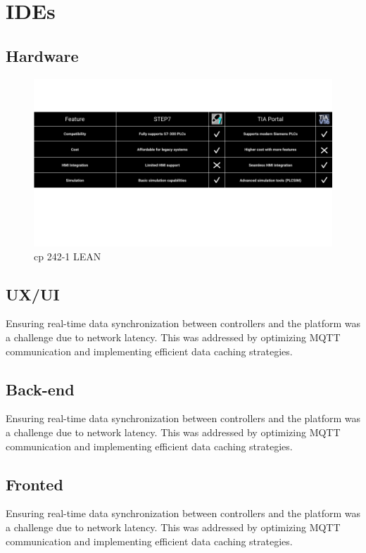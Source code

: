 \section{IDEs}

\subsection{Hardware}
\begin{figure}[H]
    \centering
    \includegraphics[width=1\textwidth]{chapters/3/img/101.png}
    \caption{cp 242-1 LEAN}
    \label{fig:campus}
\end{figure}

\subsection{UX/UI}
Ensuring real-time data synchronization between controllers and the platform was a challenge due to network latency. This was addressed by optimizing MQTT communication and implementing efficient data caching strategies.

\subsection{Back-end}
Ensuring real-time data synchronization between controllers and the platform was a challenge due to network latency. This was addressed by optimizing MQTT communication and implementing efficient data caching strategies.


\subsection{Fronted}
Ensuring real-time data synchronization between controllers and the platform was a challenge due to network latency. This was addressed by optimizing MQTT communication and implementing efficient data caching strategies.


